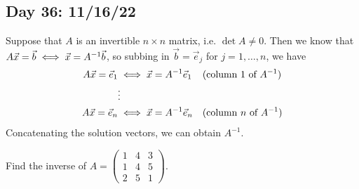 \documentclass[main.tex]{subfiles}
\begin{document}
\subsection{Day 36: 11/16/22}

Suppose that $A$ is an invertible $n\times n$ matrix, i.e. $\det A \neq 0$. Then we know that $A\vec{x} = \vec{b}\iff \vec{x} = A^{-1}\vec{b}$, so subbing in $\vec{b} = \vec{e}_j$ for $j = 1, \ldots , n$, we have
\begin{align*}
    A\vec{x} = \vec{e}_1 &\iff \vec{x} = A^{-1}\vec{e}_1 && (\text{column }1\text{ of }A^{-1}) \\
    &\vdots \\
    A\vec{x} = \vec{e}_n &\iff \vec{x} = A^{-1}\vec{e}_n && (\text{column }n\text{ of }A^{-1})
\end{align*}
Concatenating the solution vectors, we can obtain $A^{-1}$.
\begin{example}
    Find the inverse of $A = \begin{pmatrix}
        1 & 4 & 3 \\
        1 & 4 & 5 \\
        2 & 5 & 1
    \end{pmatrix}$.
\end{example}
\end{document}
